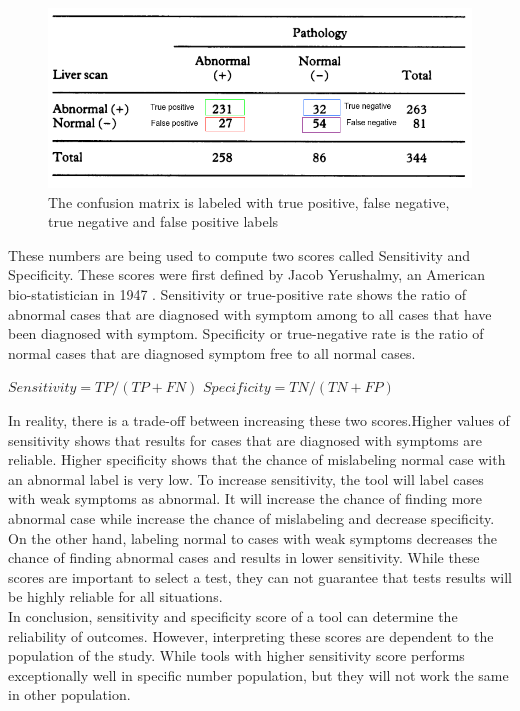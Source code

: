 \documentclass[12pt]{article}
\begin{document}
\begin{figure}
\includegraphics[width=\textwidth]{labeledCFT.png}
\caption{The confusion matrix is labeled with true positive, false negative, true negative and false positive labels} \label{fig1}
\end{figure}


These numbers are being used to compute two scores called Sensitivity and Specificity. These scores were first defined by Jacob Yerushalmy, an American bio-statistician in 1947 \cite{biostat}. Sensitivity or true-positive rate shows the ratio of abnormal cases that are diagnosed with symptom among to all cases that have been diagnosed with symptom. Specificity or true-negative rate is the ratio of normal cases that are diagnosed symptom free to all normal cases.\\
\begin{center}
$Sensitivity = TP / (TP+FN)$ \space $Specificity = TN / (TN + FP)$
\end{center}

In reality, there is a trade-off between increasing these two scores.Higher values of sensitivity shows that results for cases that are diagnosed with symptoms are reliable. Higher specificity shows that the chance of mislabeling normal case with an abnormal label is very low. To increase sensitivity, the tool will label cases with weak symptoms as abnormal. It will increase the chance of finding more abnormal case while increase the chance of mislabeling and decrease specificity. On the other hand, labeling normal to cases with weak symptoms decreases the chance of finding abnormal cases and results in lower sensitivity. While these scores are important to select a test, they can not guarantee that tests results will be highly reliable for all situations.\\ 

In conclusion, sensitivity and specificity score of a tool can determine the reliability of outcomes. However, interpreting these scores are dependent to the population of the study. While tools with higher sensitivity score  performs exceptionally well in specific number  population, but they will not work the same in other population.
\end{document}
